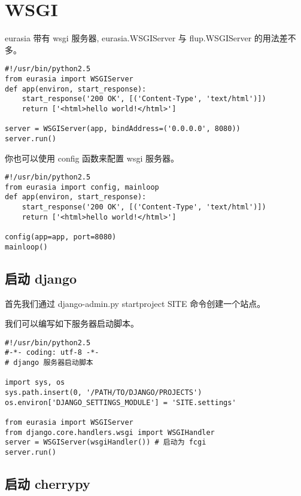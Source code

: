 \documentclass{manual}
\begin{document}
\section{WSGI}

eurasia 带有 wsgi 服务器, eurasia.WSGIServer 与 flup.WSGIServer 的用法差不多。

\begin{verbatim}
#!/usr/bin/python2.5
from eurasia import WSGIServer
def app(environ, start_response):
	start_response('200 OK', [('Content-Type', 'text/html')])
	return ['<html>hello world!</html>']

server = WSGIServer(app, bindAddress=('0.0.0.0', 8080))
server.run()
\end{verbatim}


你也可以使用 config 函数来配置 wsgi 服务器。

\begin{verbatim}
#!/usr/bin/python2.5
from eurasia import config, mainloop
def app(environ, start_response):
	start_response('200 OK', [('Content-Type', 'text/html')])
	return ['<html>hello world!</html>']

config(app=app, port=8080)
mainloop()
\end{verbatim}


\subsection{启动 django}

首先我们通过 django-admin.py startproject SITE 命令创建一个站点。

我们可以编写如下服务器启动脚本。

\begin{verbatim}
#!/usr/bin/python2.5
#-*- coding: utf-8 -*-
# django 服务器启动脚本

import sys, os
sys.path.insert(0, '/PATH/TO/DJANGO/PROJECTS')
os.environ['DJANGO_SETTINGS_MODULE'] = 'SITE.settings'

from eurasia import WSGIServer
from django.core.handlers.wsgi import WSGIHandler
server = WSGIServer(wsgiHandler()) # 启动为 fcgi
server.run()
\end{verbatim}

\subsection{启动 cherrypy}
\end{document}

